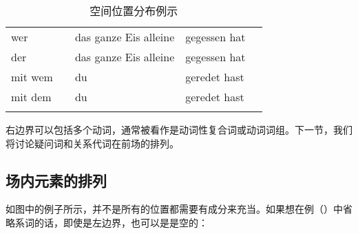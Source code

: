 \begin{table}
\begin{sideways}
\begin{tabular}{lllll}
wer     &               & das ganze Eis alleine                  & gegessen hat \\
der     &               & das ganze Eis alleine                  & gegessen hat \\
mit wem &               & du                                     & geredet hast\\
mit dem &               & du                                     & geredet hast\\\lspbottomrule
\end{tabular}
\end{sideways}
\caption{\label{bsp-topo}空间位置分布例示}
\end{table}
右边界可以包括多个动词，通常被看作是动词性复合词或动词词组。下一节，我们将讨论疑问词和关系代词在前场的排列。

\subsection{场内元素的排列}

如图中的例子所示，并不是所有的位置都需要有成分来充当。如果想在例（）中省略系词的话，即使是左边界，也可以是是空的：
\eal
\ex

